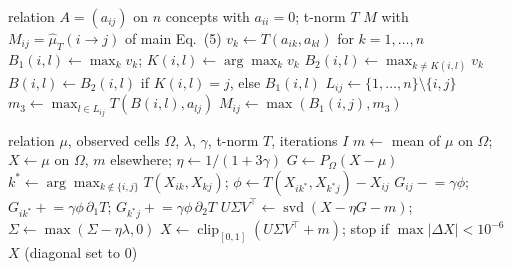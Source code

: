 \documentclass[journal]{IEEEtran}
\begin{document}
\begin{algorithm}[!t]
\caption{\textsc{FastCompose}: exact leave-dyad-out best path of two or three edges under any t-norm}
\footnotesize
\begin{algorithmic}[1]
\Require relation $A=(a_{ij})$ on $n$ concepts with $a_{ii}=0$; t-norm $T$
\Ensure $M$ with $M_{ij}=\hat\mu_T(i\to j)$ of main Eq.~(5)
 
\State $v_k\gets T(a_{ik},a_{kl})$ for $k=1,\dots,n$
\State $B_1(i,l)\gets\max_kv_k$; $K(i,l)\gets\arg\max_kv_k$
\State $B_2(i,l)\gets\max_{k\ne K(i,l)}v_k$
\EndFor
{} 
\State $B(i,l)\gets B_2(i,l)$ if $K(i,l)=j$, else $B_1(i,l)$ 
\EndFor
{}
\State $L_{ij}\gets\{1,\dots,n\}\setminus\{i,j\}$ 
\State $m_3\gets\max_{l\in L_{ij}}T(B(i,l),a_{lj})$
\State $M_{ij}\gets\max(B_1(i,j),m_3)$ 
\EndFor
\EndFor
\end{algorithmic}
\end{algorithm}

\begin{algorithm}[!t]
\caption{Path-consistent completion (PCC): proximal gradient on main Eq.~(6)}\label{alg:pcc}
\begin{algorithmic}[1]
\Require relation $\mu$, observed cells $\Omega$, $\lambda$, $\gamma$, t-norm $T$, iterations $I$
\State $m\gets$ mean of $\mu$ on $\Omega$; $X\gets\mu$ on $\Omega$, $m$ elsewhere; $\eta\gets1/(1+3\gamma)$
  \State $G\gets P_\Omega(X-\mu)$
   
    \State $k^*\gets\arg\max_{k\notin\{i,j\}}T(X_{ik},X_{kj})$; $\phi\gets T(X_{ik^*},X_{k^*j})-X_{ij}$
    \State $G_{ij}\mathrel{-}=\gamma\phi$; $G_{ik^*}\mathrel{+}=\gamma\phi\,\partial_1T$; $G_{k^*j}\mathrel{+}=\gamma\phi\,\partial_2T$
  \EndFor
  \State $U\Sigma V^\top\gets\operatorname{svd}(X-\eta G-m)$; $\Sigma\gets\max(\Sigma-\eta\lambda,0)$
  \State $X\gets\operatorname{clip}_{[0,1]}(U\Sigma V^\top+m)$; stop if $\max|\Delta X|<10^{-6}$
\EndFor
\State \Return $X$ (diagonal set to 0)
\end{algorithmic}
\end{algorithm}
\end{document}
